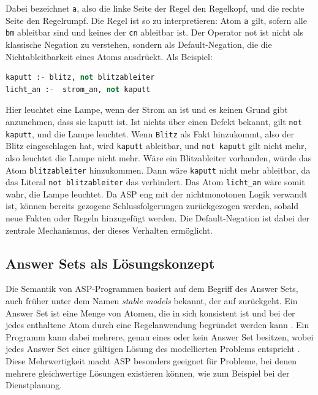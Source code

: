 Dabei bezeichnet \texttt{a}, also die linke Seite der Regel den Regelkopf, und die rechte Seite den Regelrumpf. Die Regel ist so zu interpretieren: Atom \texttt{a} gilt, sofern alle \texttt{bm} ableitbar sind und keines der \texttt{cn} ableitbar ist. 
Der Operator not ist nicht als klassische Negation zu verstehen, sondern als Default-Negation, die die Nichtableitbarkeit eines Atoms ausdrückt. \newline
Als Beispiel:
\begin{lstlisting}[language=python]
kaputt :- blitz, not blitzableiter
licht_an :-  strom_an, not kaputt
\end{lstlisting}
Hier leuchtet eine Lampe, wenn der Strom an ist und es keinen Grund gibt anzunehmen, dass sie kaputt ist. Ist nichts über einen Defekt bekannt, gilt \texttt{not kaputt}, und die Lampe leuchtet.
Wenn \texttt{Blitz} als Fakt hinzukommt, also der Blitz eingeschlagen hat, wird \texttt{kaputt} ableitbar, und \texttt{not kaputt} gilt nicht mehr, also leuchtet die Lampe nicht mehr. Wäre ein Blitzableiter vorhanden, würde das Atom \texttt{blitzableiter} hinzukommen. Dann wäre \texttt{kaputt} nicht mehr ableitbar, da das Literal \texttt{not blitzableiter} das verhindert. Das Atom \texttt{licht\_an} wäre somit wahr, die Lampe leuchtet.
Da ASP eng mit der nichtmonotonen Logik verwandt ist, können bereits gezogene Schlussfolgerungen zurückgezogen werden, sobald neue Fakten oder Regeln hinzugefügt werden. Die Default-Negation ist dabei der zentrale Mechanismus, der dieses Verhalten ermöglicht.
\subsection{Answer Sets als Lösungskonzept}
Die Semantik von ASP-Programmen basiert auf dem Begriff des Answer Sets, auch früher unter dem Namen \textit{stable models} bekannt, der auf \textcite{stableModelSemanticGelfond} zurückgeht. Ein Answer Set ist eine Menge von Atomen, die in sich konsistent ist und bei der jedes enthaltene Atom durch eine Regelanwendung begründet werden kann \parencite{brewkaAnswerSetProgramming2011}. Ein Programm kann dabei mehrere, genau eines oder kein Answer Set besitzen, wobei jedes Answer Set einer gültigen Lösung des modellierten Problems entspricht \parencite{brewkaAnswerSetProgramming2011}. Diese Mehrwertigkeit macht ASP besonders geeignet für Probleme, bei denen mehrere gleichwertige Lösungen existieren können, wie zum Beispiel bei der Dienstplanung.
